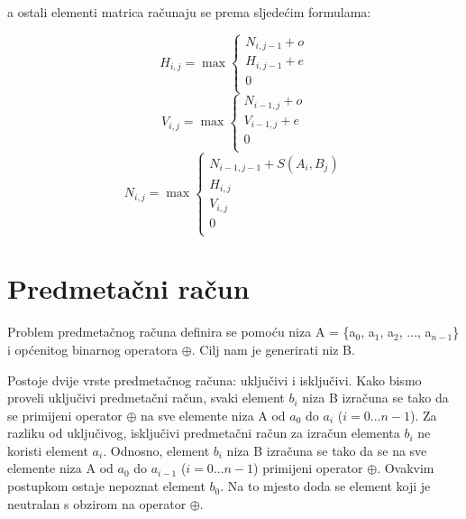 \documentclass[times, utf8, zavrsni, numeric]{fer}
\begin{document}
a ostali elementi matrica računaju se prema sljedećim formulama:
\begin{center}
\begin{equation}
H_{i,j} = \max \left\{
	\begin{array}{lr}
		N_{i,j-1} + o \\
		H_{i, j-1} + e \\
		0\\
	\end{array}
\right.
\end{equation}
\begin{equation}
V_{i,j} = \max \left\{
	\begin{array}{lr}
		N_{i-1,j} + o \\
		V_{i-1, j} + e \\
		0\\
	\end{array}
\right.
\end{equation}
\begin{equation}
N_{i,j} = \max \left\{
	\begin{array}{lr}
		N_{i-1,j-1} + S(A_{i}, B_{j}) \\
		H_{i, j}\\
		V_{i, j}\\
		0\\
	\end{array}
\right.
\end{equation}
\end{center}

\chapter{Predmetačni račun}
\indent

Problem predmetačnog računa definira se pomoću niza A = \{a$_{0}$, a$_{1}$, a$_{2}$, ..., a$_{n-1}$\} i općenitog binarnog operatora $\oplus$. Cilj nam je generirati niz B. 

Postoje dvije vrste predmetačnog računa: uključivi i isključivi.
Kako bismo proveli uključivi predmetačni račun, svaki element $b_{i}$ niza B izračuna se tako da se primijeni operator $\oplus$ na sve elemente niza A od $a_{0}$ do $a_{i}$ ($i = 0...n-1$).
Za razliku od uključivog, isključivi predmetačni račun za izračun elementa $b_{i}$ ne koristi element $a_{i}$. Odnosno, element $b_{i}$ niza B izračuna se tako da se na sve elemente niza A od $a_{0}$ do $a_{i - 1}$ ($i = 0...n-1$) primijeni operator $\oplus$. Ovakvim postupkom ostaje nepoznat element $b_{0}$. Na to mjesto doda se element koji je neutralan s obzirom na operator $\oplus$.
\end{document}

